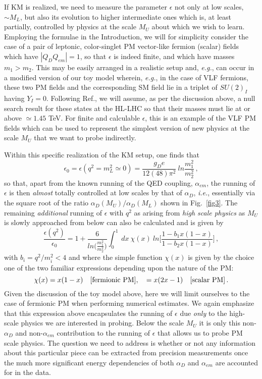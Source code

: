 \documentclass[14pt]{article}
\def\ie{{\it i.e.}}
\def\eg{{\it e.g.}}
\begin{document}
{If KM is realized, we need to measure the parameter $\epsilon$ not only at low scales, $\sim M_L$, but also its evolution to higher intermediate ones which is, at least partially, controlled by 
physics at the 
scale $M_U$ about which we wish to learn. Employing the formulae in the Introduction, we will for simplicity consider the case of a pair of leptonic, color-singlet PM vector-like fermion (scalar) fields 
which have $|Q_DQ_{em}|=1$, so that $\epsilon$ is indeed finite, and which have masses $m_1>m_2$. This may be easily arranged in a realistic setup and, \eg, can occur in a modified version 
of our toy model wherein, \eg, in the case of VLF fermions, these two PM fields and the corresponding SM field lie in a triplet of $SU(2)_I$ having $Y_I=0$.  Following Ref.\cite{Guedes:2021oqx},
we will assume, as per the discussion above, a null search result for these states at the HL-LHC so that their masses must lie at or above $\simeq 1.45$ TeV. For finite and calculable $\epsilon$, this is 
an example of the VLF PM fields which can be used to represent the simplest version of new physics at the scale $M_U$ that we want to probe indirectly. 

Within this specific realization of the KM setup, one finds  that 
%
\begin{equation}
\epsilon_0=\epsilon(q^2=m_L^2\simeq 0)=\frac{g_De}{12(48)\pi^2}~ln \frac{m_1^2}{m_2^2}\,,  
\end{equation}
%
so that, apart from the known running of the QED coupling, $\alpha_{em}$, the running of $\epsilon$ is then {\it almost} totally controlled at low scales by that of $\alpha_D$, \ie, essentially via the 
square root of the ratio $\alpha_D(M_U)/\alpha_D(M_L)$ shown in Fig.~\ref{fig3}. The remaining {\it additional} running of $\epsilon$ with $q^2$ as arising from {\it high scale physics} as $M_U$ is slowly 
approached from below can also be calculated and is given by 
%
\begin{equation}
\frac{\epsilon(q^2)}{\epsilon_0}=1+\frac{6}{ln \big(\frac{m_1^2}{m_2^2}\big)}\int_0^1 ~dx~\chi(x)~ln \Big[\frac{1-b_1x(1-x)}{1-b_2x(1-x)}\Big]\,,  
\end{equation}
%
with $b_i=q^2/m_i^2<4$ and where the simple function $\chi(x)$ is given by the choice one of the two familiar expressions depending upon the nature of the PM:
%
\begin{equation}
\chi(x)= x(1-x)~~~ {[\rm{fermionic ~PM}}],~~~=x(2x-1)~~~[{\rm{scalar ~PM}}]\,.  
\end{equation}
%
Given the discussion of the toy model above, here we will limit ourselves to the case of fermionic PM when performing numerical estimates. We again emphasize that this expression above 
encapsulates the running of $\epsilon$ due {\it only} to the high-scale physics we are interested in probing. Below the scale $M_U$ it is only this non-$\alpha_D$  and non-$\alpha_{em}$ contribution 
to the running of $\epsilon$ that allows us to probe PM scale physics. The question we need to address is whether or not any information about this particular piece can be extracted from 
precision measurements once the much more significant energy dependencies of both $\alpha_D$ and $\alpha_{em}$ are accounted for in the data.

}
\end{document}
